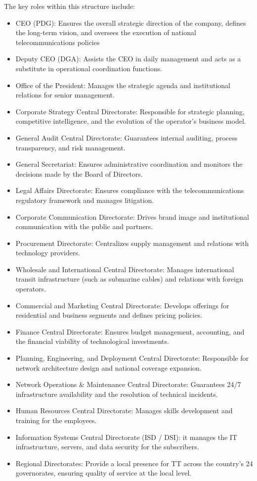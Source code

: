 The key roles within this structure include:
\begin{itemize}
    \item CEO (PDG): Ensures the overall strategic direction of the company, defines the long-term vision, and oversees the execution of national telecommunications policies
    \item Deputy CEO (DGA): Assists the CEO in daily management and acts as a substitute in operational coordination functions.
    \item Office of the President: Manages the strategic agenda and institutional relations for senior management.
    \item Corporate Strategy Central Directorate: Responsible for strategic planning, competitive intelligence, and the evolution of the operator's business model.
    \item General Audit Central Directorate: Guarantees internal auditing, process transparency, and risk management.
    \item General Secretariat: Ensures administrative coordination and monitors the decisions made by the Board of Directors.
    \item Legal Affairs Directorate: Ensures compliance with the telecommunications regulatory framework and manages litigation.
    \item Corporate Communication Directorate: Drives brand image and institutional communication with the public and partners.
    \item Procurement Directorate: Centralizes supply management and relations with technology providers.
    \item Wholesale and International Central Directorate: Manages international transit infrastructure (such as submarine cables) and relations with foreign operators.
    \item Commercial and Marketing Central Directorate: Develops offerings for residential and business segments and defines pricing policies.
    \item Finance Central Directorate: Ensures budget management, accounting, and the financial viability of technological investments.
    \item Planning, Engineering, and Deployment Central Directorate: Responsible for network architecture design and national coverage expansion.
    \item Network Operations \& Maintenance Central Directorate: Guarantees 24/7 infrastructure availability and the resolution of technical incidents.
    \item Human Resources Central Directorate: Manages skills development and training for the employees.
    \item Information Systems Central Directorate (ISD / DSI): it manages the IT infrastructure, servers, and data security for the subscribers.
    \item Regional Directorates: Provide a local presence for TT across the country's 24 governorates, ensuring quality of service at the local level.
\end{itemize}

